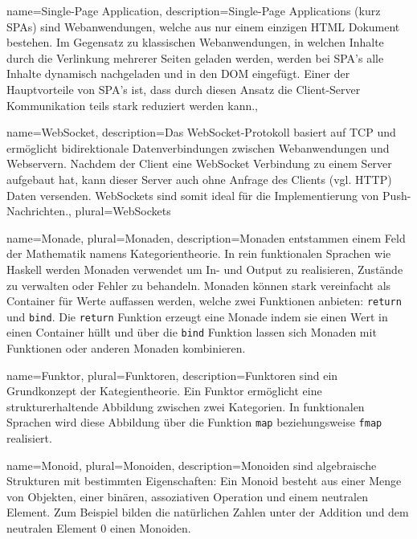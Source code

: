 {
name={Single-Page Application},
description={Single-Page Applications (kurz SPAs) sind Webanwendungen, welche aus nur einem einzigen HTML Dokument bestehen. Im Gegensatz zu klassischen Webanwendungen, in welchen Inhalte durch die Verlinkung mehrerer Seiten geladen werden, werden bei SPA's alle Inhalte dynamisch nachgeladen und in den DOM eingefügt. Einer der Hauptvorteile von SPA's ist, dass durch diesen Ansatz die Client-Server Kommunikation teils stark reduziert werden kann.},
}

{
name={WebSocket},
description={Das WebSocket-Protokoll basiert auf TCP und ermöglicht bidirektionale Datenverbindungen zwischen Webanwendungen und Webservern. Nachdem der Client eine WebSocket Verbindung zu einem Server aufgebaut hat, kann dieser Server auch ohne Anfrage des Clients (vgl. HTTP) Daten versenden. WebSockets sind somit ideal für die Implementierung von Push-Nachrichten.},
plural={WebSockets}
}

{
name={Monade},
plural={Monaden},
description={Monaden entstammen einem Feld der Mathematik namens Kategorientheorie. In rein funktionalen Sprachen wie Haskell werden Monaden verwendet um In- und Output zu realisieren, Zustände zu verwalten oder Fehler zu behandeln. Monaden können stark vereinfacht als Container für Werte auffassen werden, welche zwei Funktionen anbieten: \texttt{return} und \texttt{bind}. Die \texttt{return} Funktion erzeugt eine Monade indem sie einen Wert in einen Container hüllt und über die \texttt{bind} Funktion lassen sich Monaden mit Funktionen oder anderen Monaden kombinieren.}
}

{
name={Funktor},
plural={Funktoren},
description={Funktoren sind ein Grundkonzept der Kategientheorie. Ein Funktor ermöglicht eine strukturerhaltende Abbildung zwischen zwei Kategorien. In funktionalen Sprachen wird diese Abbildung über die Funktion \texttt{map} beziehungsweise \texttt{fmap} realisiert.}
}

{
name={Monoid},
plural={Monoiden},
description={Monoiden sind algebraische Strukturen mit bestimmten Eigenschaften: Ein Monoid besteht aus einer Menge von Objekten, einer binären, assoziativen Operation und einem neutralen Element. Zum Beispiel bilden die natürlichen Zahlen unter der Addition und dem neutralen Element 0 einen Monoiden.}
}
